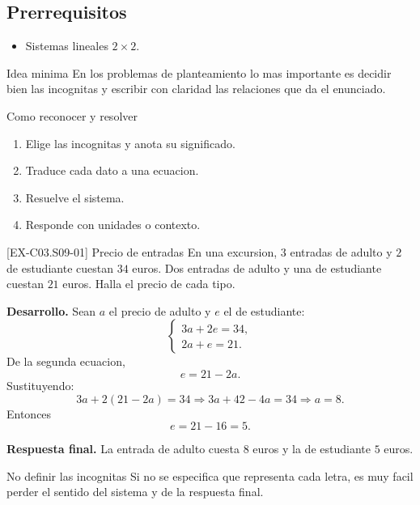 \subsection*{Prerrequisitos}
\begin{itemize}
  \item Sistemas lineales \(2\times 2\).
\end{itemize}

\begin{theorybox}{Idea minima}
En los problemas de planteamiento lo mas importante es decidir bien las incognitas y escribir
con claridad las relaciones que da el enunciado.
\end{theorybox}

\begin{methodbox}{Como reconocer y resolver}
\begin{enumerate}
  \item Elige las incognitas y anota su significado.
  \item Traduce cada dato a una ecuacion.
  \item Resuelve el sistema.
  \item Responde con unidades o contexto.
\end{enumerate}
\end{methodbox}

\begin{solvedexample}{[EX-C03.S09-01] Precio de entradas}
En una excursion, \(3\) entradas de adulto y \(2\) de estudiante cuestan \(34\) euros. Dos
entradas de adulto y una de estudiante cuestan \(21\) euros. Halla el precio de cada tipo.

\textbf{Desarrollo.} Sean \(a\) el precio de adulto y \(e\) el de estudiante:
\[
\begin{cases}
3a+2e=34,\\
2a+e=21.
\end{cases}
\]
De la segunda ecuacion,
\[
e=21-2a.
\]
Sustituyendo:
\[
3a+2(21-2a)=34 \Longrightarrow 3a+42-4a=34 \Longrightarrow a=8.
\]
Entonces
\[
e=21-16=5.
\]

\textbf{Respuesta final.}
La entrada de adulto cuesta \(8\) euros y la de estudiante \(5\) euros.
\end{solvedexample}

\begin{commonerror}{No definir las incognitas}
Si no se especifica que representa cada letra, es muy facil perder el sentido del sistema y de
la respuesta final.
\end{commonerror}

